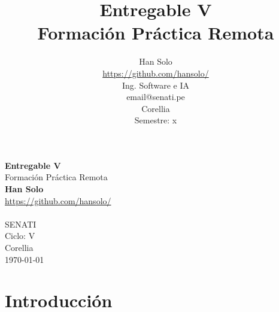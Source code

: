\documentclass[12pt]{article}
\title{ Entregable V\\ Formación Práctica Remota}
\author{Han Solo \\ \url{https://github.com/hansolo/}\\ Ing. Software e IA \\ email@senati.pe \\ Corellia \\ Semestre: x\\ }
\begin{document}
\begin{titlepage}

\begin{center}
    \vspace*{1cm}
    \Huge
    \textbf{Entregable V}\\
    \LARGE
    Formación Práctica Remota\\
    \vspace*{2cm}
    \textbf{Han Solo}\\
    \url{https://github.com/hansolo/}\\
    \vfill
    \vspace*{1.2cm}
    \\
    \vspace{0.8cm}
    \Large
    SENATI\\
    Ciclo: V\\
    Corellia\\
    \today
\end{center}
\end{titlepage}

\newpage
\tableofcontents
\listoffigures
\newpage


\section{Introducción}
\end{document}
